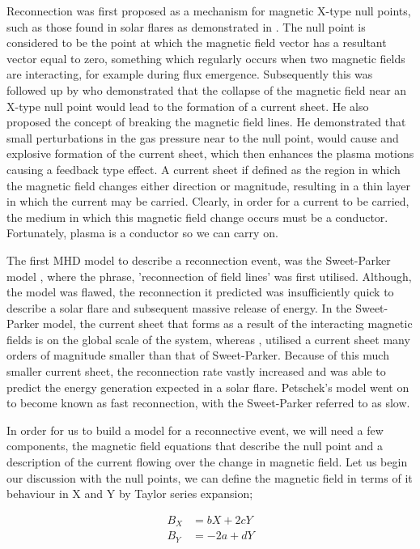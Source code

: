 Reconnection was first proposed as a mechanism for magnetic X-type null points, such as those found in solar flares as demonstrated in  \cite{Giovanelli1946}.
The null point is considered to be the point at which the magnetic field vector has a resultant vector equal to zero, something which regularly occurs when two magnetic fields are interacting, for example during flux emergence.
Subsequently this was followed up by \cite{Dungey1953} who demonstrated that the collapse of the magnetic field near an X-type null point would lead to the formation of a current sheet.
He also proposed the concept of breaking the magnetic field lines.
He demonstrated that small perturbations in the gas pressure near to the null point, would cause and explosive formation of the current sheet, which then enhances the plasma motions causing a feedback type effect.
A current sheet if defined as the region in which the magnetic field changes either direction or magnitude, resulting in a thin layer in which the current may be carried.
Clearly, in order for a current to be carried, the medium in which this magnetic field change occurs must be a conductor.
Fortunately, plasma is a conductor so we can carry on. 

The first MHD model to describe a reconnection event, was the Sweet-Parker model \citep{Sweet1958, Parker1957}, where the phrase, 'reconnection of field lines' was first utilised.
Although, the model was flawed, the reconnection it predicted was insufficiently quick to describe a solar flare and subsequent massive release of energy.
In the Sweet-Parker model, the current sheet that forms as a result of the interacting magnetic fields is on the global scale of the system, whereas \cite{Petschek1964}, utilised a current sheet many orders of magnitude smaller than that of Sweet-Parker.
Because of this much smaller current sheet, the reconnection rate vastly increased and was able to predict the energy generation expected in a solar flare. 
Petschek's model went on to become known as fast reconnection, with the Sweet-Parker referred to as slow.

In order for us to build a model for a reconnective event, we will need a few components, the magnetic field equations that describe the null point and a description of the current flowing over the change in magnetic field.
Let us begin our discussion with the null points, we can define the magnetic field in terms of it behaviour in X and Y by Taylor series expansion;

\begin{align}
	B_X &= bX + 2cY\\
	B_Y &= -2a + dY
\end{align}

